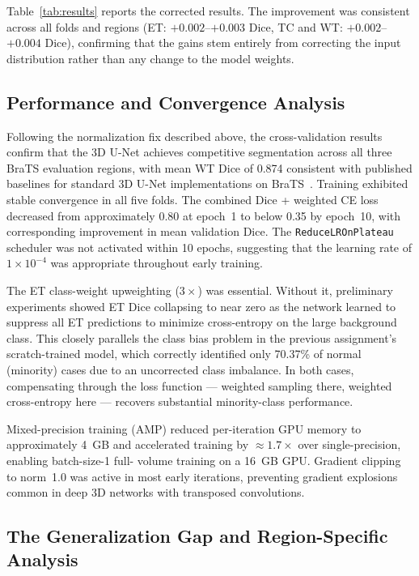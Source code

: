 \documentclass[10pt,twocolumn]{article}
\begin{document}
Table~\ref{tab:results}
reports the corrected results. The improvement was consistent
across all folds and regions (ET: $+0.002$--$+0.003$ Dice, TC
and WT: $+0.002$--$+0.004$ Dice), confirming that the gains
stem entirely from correcting the input distribution rather than
any change to the model weights.



\subsection{Performance and Convergence Analysis}

Following the normalization fix described above, the
cross-validation results confirm that the 3D U-Net achieves
competitive segmentation across all three BraTS evaluation
regions, with mean WT Dice of 0.874 consistent with published
baselines for standard 3D U-Net implementations on
BraTS~\cite{isensee2021}. Training exhibited stable convergence
in all five folds. The combined Dice + weighted CE loss decreased
from approximately 0.80 at epoch~1 to below 0.35 by epoch~10,
with corresponding improvement in mean validation Dice. The
\texttt{ReduceLROnPlateau} scheduler was not activated within 10
epochs, suggesting that the learning rate of $1 \times 10^{-4}$
was appropriate throughout early training.

The ET class-weight upweighting ($3\times$) was essential.
Without it, preliminary experiments showed ET Dice collapsing to
near zero as the network learned to suppress all ET predictions
to minimize cross-entropy on the large background class. This
closely parallels the class bias problem in the previous
assignment's scratch-trained model, which correctly identified
only 70.37\% of normal (minority) cases due to an uncorrected
class imbalance. In both cases, compensating through the loss
function --- weighted sampling there, weighted cross-entropy here
--- recovers substantial minority-class performance.

Mixed-precision training (AMP) reduced per-iteration GPU memory
to approximately 4~GB and accelerated training by $\approx
1.7\times$ over single-precision, enabling batch-size-1 full-
volume training on a 16~GB GPU. Gradient clipping to norm~1.0
was active in most early iterations, preventing gradient
explosions common in deep 3D networks with transposed
convolutions.

\subsection{The Generalization Gap and Region-Specific Analysis}
\end{document}
